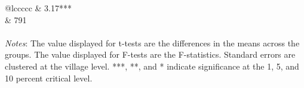 \begin{tabular}{@{\extracolsep{5pt}}lccccc}
\hline
{} & 3.17*** \\
 &       791 \\
\hline \hline \\[-1.8ex]
{\textit{Notes}:  The value displayed for t-tests are the differences in the means across the groups. The value displayed for F-tests are the F-statistics. Standard errors are clustered at the village level. ***, **, and * indicate significance at the 1, 5, and 10 percent critical level. }
\end{tabular}
